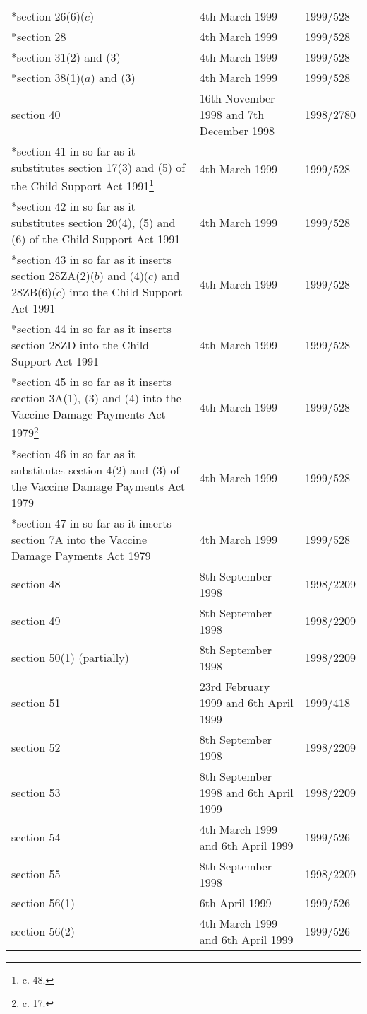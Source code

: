 \documentclass[12pt,a4paper]{article}
\begin{document}
{\begin{longtable}{p{193.78079pt}p{78.37471pt}p{81.83215pt}}
{}*section 26(6)($c$)	&4th March 1999	&1999/528\\
{}*section 28	&4th March 1999	&1999/528\\
{}*section 31(2) and (3)	&4th March 1999	&1999/528\\
{}*section 38(1)($a$) and (3)	&4th March 1999	&1999/528\\
section 40	&16th November 1998 and 7th December 1998&	1998/2780\\
{}*section 41 in so far as it substitutes section 17(3) and (5) of the Child Support Act 1991\footnote{\frenchspacing 1991 c. 48.}	&4th March 1999	&1999/528\\
{}*section 42 in so far as it substitutes section 20(4), (5) and (6) of the Child Support Act 1991	&4th March 1999	&1999/528\\
{}*section 43 in so far as it inserts section 28ZA(2)($b$) and (4)($c$) and 28ZB(6)($c$) into the Child Support Act 1991	&4th March 1999	&1999/528\\
{}*section 44 in so far as it inserts section 28ZD into the Child Support Act 1991	&4th March 1999	&1999/528\\
{}*section 45 in so far as it inserts section 3A(1), (3) and (4) into the Vaccine Damage Payments Act 1979\footnote{\frenchspacing 1979 c. 17.}	&4th March 1999	&1999/528\\
{}*section 46 in so far as it substitutes section 4(2) and (3) of the Vaccine Damage Payments Act 1979	&4th March 1999	&1999/528\\
{}*section 47 in so far as it inserts section 7A into the Vaccine Damage Payments Act 1979	&4th March 1999	&1999/528\\
section 48	&8th September 1998	&1998/2209\\
section 49	&8th September 1998	&1998/2209\\
section 50(1) (partially)	&8th September 1998	&1998/2209\\
section 51	&23rd February 1999 and 6th April 1999	&1999/418\\
section 52	&8th September 1998	&1998/2209\\
section 53	&8th September 1998 and 6th April 1999	&1998/2209\\
section 54	&4th March 1999 and 6th April 1999	&1999/526\\
section 55	&8th September 1998	&1998/2209\\
section 56(1)	&6th April 1999	&1999/526\\
section 56(2)	&4th March 1999 and 6th April 1999	&1999/526\\

\end{longtable}}
\end{document}

